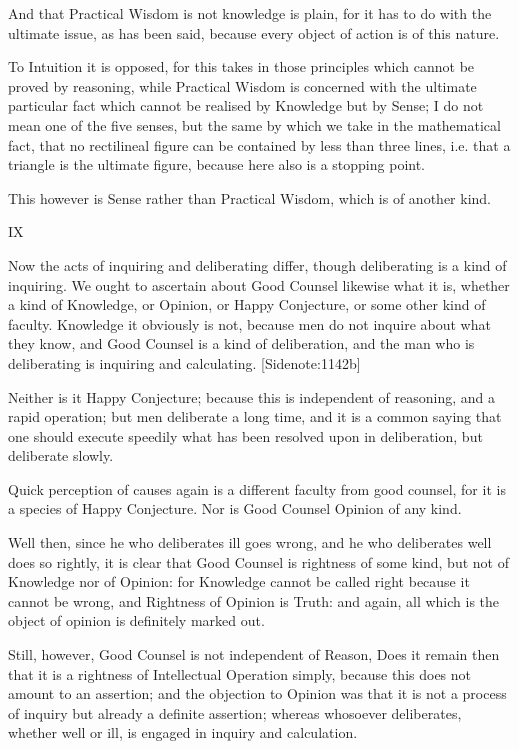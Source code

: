 And that Practical Wisdom is not knowledge is plain, for it has to do
with the ultimate issue, as has been said, because every object of
action is of this nature.

To Intuition it is opposed, for this takes in those principles which
cannot be proved by reasoning, while Practical Wisdom is concerned with
the ultimate particular fact which cannot be realised by Knowledge but
by Sense; I do not mean one of the five senses, but the same by which
we take in the mathematical fact, that no rectilineal figure can be
contained by less than three lines, i.e. that a triangle is the ultimate
figure, because here also is a stopping point.

This however is Sense rather than Practical Wisdom, which is of another
kind.

IX

Now the acts of inquiring and deliberating differ, though deliberating
is a kind of inquiring. We ought to ascertain about Good Counsel
likewise what it is, whether a kind of Knowledge, or Opinion, or Happy
Conjecture, or some other kind of faculty. Knowledge it obviously is
not, because men do not inquire about what they know, and Good Counsel
is a kind of deliberation, and the man who is deliberating is inquiring
and calculating. [Sidenote:1142b]

Neither is it Happy Conjecture; because this is independent of
reasoning, and a rapid operation; but men deliberate a long time, and
it is a common saying that one should execute speedily what has been
resolved upon in deliberation, but deliberate slowly.

Quick perception of causes again is a different faculty from good
counsel, for it is a species of Happy Conjecture. Nor is Good Counsel
Opinion of any kind.

Well then, since he who deliberates ill goes wrong, and he who
deliberates well does so rightly, it is clear that Good Counsel is
rightness of some kind, but not of Knowledge nor of Opinion: for
Knowledge cannot be called right because it cannot be wrong, and
Rightness of Opinion is Truth: and again, all which is the object of
opinion is definitely marked out.

Still, however, Good Counsel is not independent of Reason, Does it
remain then that it is a rightness of Intellectual Operation simply,
because this does not amount to an assertion; and the objection to
Opinion was that it is not a process of inquiry but already a definite
assertion; whereas whosoever deliberates, whether well or ill, is
engaged in inquiry and calculation.


